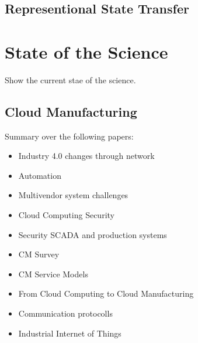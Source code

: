\documentclass[
a4paper,
twoside,
headsepline,
cleardoublepage=empty,
parskip=half,
draft=false
]{scrbook}
\begin{document}
		\section{Representional State Transfer}\label{sec:rest}
						
	\chapter{State of the Science} \label{ch:state_of_the_Science}
	
		Show the current stae of the science.
		
		\section{Cloud Manufacturing}\label{sec:industry_4}
		
			Summary over the following papers:
			
			\begin{itemize}
				
				\item Industry 4.0 changes through network~\cite{brettel2014virtualization}
				
				\item Automation~\cite{jazdi2014cyber}
				
				\item Multivendor system challenges~\cite{weyer2015towards}
				
				\item Cloud Computing Security~\cite{subashini2011survey}
				
				\item Security SCADA and production systems~\cite{igure2006security}
				
				\item CM Survey~\cite{he2015state}
				
				\item CM Service Models~\cite{li2010cloud}
				
				\item From Cloud Computing to Cloud Manufacturing~\cite{xu2012cloud}
				
				\item Communication protocolls~\cite{wollschlaeger2017future}
				
				\item Industrial Internet of Things~\cite{jeschke2017industrial}
				
			\end{itemize}
		
\end{document}
